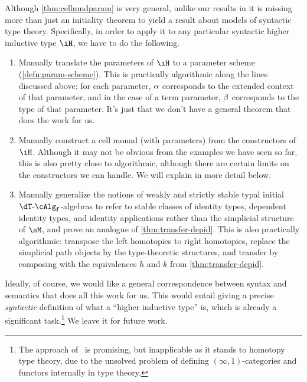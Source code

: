 \documentclass[referee]{psp}
\def\alg{\text{-}\cAlg}
\def\algf{\alg_{\mathbf{f}}}
\begin{document}
Although \cref{thm:cellmndparam} is very general, unlike our results in  it is missing more than just an initiality theorem to yield a result about models of syntactic type theory.
Specifically, in order to apply it to any particular syntactic higher inductive type $\iH$, we have to do the following.
\begin{enumerate}
\item Manually translate the parameters of $\iH$ to a parameter scheme (\cref{defn:param-scheme}).
  This is practically algorithmic along the lines discussed above: for each parameter, $\alpha$ corresponds to the extended context of that parameter, and in the case of a term parameter, $\beta$ corresponds to the type of that parameter.
  It's just that we don't have a general theorem that does the work for us.
\item Manually construct a cell monad \dT (with parameters) from the constructors of $\iH$.
  Although it may not be obvious from the examples we have seen so far, this is also pretty close to algorithmic, although there are certain limits on the constructors we can handle.
  We will explain in more detail below.\label{item:hit-mnd}
\item Manually generalize the notions of weakly and strictly stable typal initial $\dT\algf$-algebras to refer to stable classes of identity types, dependent identity types, and identity applications rather than the simplicial structure of $\sM$, and prove an analogue of \cref{thm:transfer-depid}.
  This is also practically algorithmic: transpose the left homotopies to right homotopies, replace the simplicial path objects by the type-theoretic structures, and transfer by composing with the equivalences $h$ and $k$ from \cref{thm:transfer-depid}.
\end{enumerate}
Ideally, of course, we would like a general correspondence between syntax and semantics that does all this work for us.
This would entail giving a precise \emph{syntactic} definition of what a ``higher inductive type'' is, which is already a significant task.\footnote{The approach of~\cite{acdf:qiits} is promising, but inapplicable as it stands to homotopy type theory, due to the unsolved problem of defining $(\infty,1)$-categories and functors internally in type theory.}
We leave it for future work.
\end{document}
